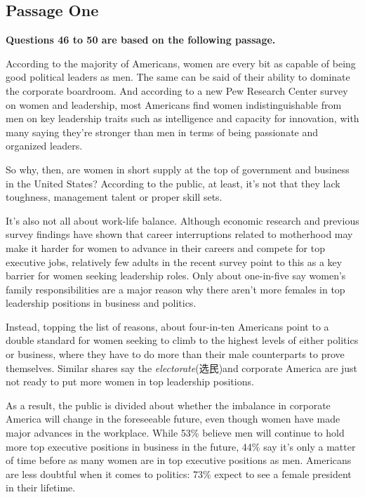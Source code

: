 \documentclass[UTF8,11pt]{ctexart}
\begin{document}
\subsection*{\textbf{Passage One}}


\textbf{Questions 46 to 50 are based on the following passage.}


According to the majority of Americans, women are every bit as capable of being good political leaders as men. The same can be said of their ability to dominate the corporate boardroom. And according to a new Pew Research Center survey on women and leadership, most Americans find women indistinguishable from men on key leadership traits such as intelligence and capacity for innovation, with many saying they’re stronger than men in terms of being passionate and organized leaders.


So why, then, are women in short supply at the top of government and business in the United States? According to the public, at least, it’s not that they lack toughness, management talent or proper skill sets.


It’s also not all about work-life balance. Although economic research and previous survey findings have shown that career interruptions related to motherhood may make it harder for women to advance in their careers and compete for top executive jobs, relatively few adults in the recent survey point to this as a key barrier for women seeking leadership roles. Only about one-in-five say women’s family responsibilities are a major reason why there aren’t more females in top leadership positions in business and politics.


Instead, topping the list of reasons, about four-in-ten Americans point to a double standard for women seeking to climb to the highest levels of either politics or business, where they have to do more than their male counterparts to prove themselves. Similar shares say the\textit{ electorate}(选民)and corporate America are just not ready to put more women in top leadership positions.


As a result, the public is divided about whether the imbalance in corporate America will change in the foreseeable future, even though women have made major advances in the workplace. While 53\% believe men will continue to hold more top executive positions in business in the future, 44\% say it’s only a matter of time before as many women are in top executive positions as men. Americans are less doubtful when it comes to politics: 73\% expect to see a female president in their lifetime.
\end{document}
